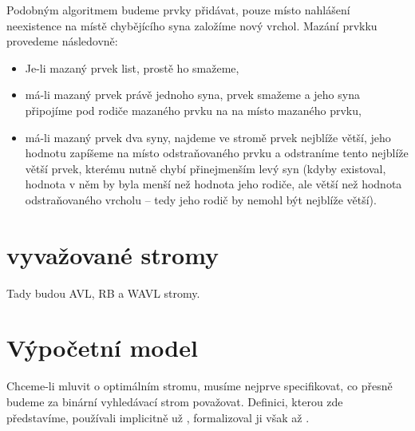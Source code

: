 Podobným algoritmem budeme prvky přidávat, pouze místo nahlášení neexistence na místě chybějícího syna založíme nový vrchol. Mazání prvkku provedeme následovně:
\begin{itemize}
\item Je-li mazaný prvek list, prostě ho smažeme,
\item má-li mazaný prvek právě jednoho syna, prvek smažeme a jeho syna připojíme pod rodiče mazaného prvku na na místo mazaného prvku,
\item má-li mazaný prvek dva syny, najdeme ve stromě prvek nejblíže větší, jeho
hodnotu zapíšeme na místo odstraňovaného prvku a odstraníme tento nejblíže větší
prvek, kterému nutně chybí přinejmenším levý syn (kdyby existoval, hodnota v
něm by byla menší než hodnota jeho rodiče, ale větší než hodnota odstraňovaného
vrcholu -- tedy jeho rodič by nemohl být nejblíže větší).  
\end{itemize} 

\section{vyvažované stromy}

Tady budou AVL, RB a WAVL stromy.


\section{Výpočetní model}
Chceme-li mluvit o optimálním stromu, musíme nejprve specifikovat, co přesně
budeme za binární vyhledávací strom považovat. Definici, kterou zde
představíme, používali implicitně už \citet{splay}, formalizoval ji však až
\citet{tango}.



